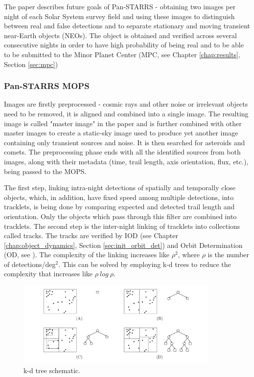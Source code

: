 	The paper describes future goals of Pan-STARRS - obtaining two images per night of each Solar System survey field and using these images to distinguish between real and false detections and to separate stationary and moving transient near-Earth objects (NEOs). The object is obtained and verified across several consecutive nights in order to have high probability of being real and to be able to be submitted to the Minor Planet Center (MPC, see Chapter \ref{chap:results}, Section \ref{sec:mpc})
	
\subsubsection{Pan-STARRS MOPS}
	
	Images are firstly preprocessed - cosmic rays and other noise or irrelevant objects need to be removed, it is aligned and combined into a single image. The resulting image is called "master image" in the paper and is further combined with other master images to create a static-sky image used to produce yet another image containing only transient sources and noise. It is then searched for asteroids and comets. The preprocessing phase ends with all the identified sources from both images, along with their metadata (time, trail length, axis orientation, flux, etc.), being passed to the MOPS.
	
	The first step, linking intra-night detections of spatially and temporally close objects, which, in addition, have fixed speed among multiple detections, into tracklets, is being done by comparing expected and detected trail length and orientation. Only the objects which pass through this filter are combined into tracklets. The second step is the inter-night linking of tracklets into collections called tracks. The tracks are verified by IOD (see Chapter \ref{chap:object_dynamics}, Section \ref{sec:init_orbit_det}) and Orbit Determination (OD, see \citep{klinkrad2006space}). The complexity of the linking increases like $\rho^2$, where $\rho$ is the number of detections/deg$^2$. This can be solved by employing k-d trees to reduce the complexity that increases like $\rho\ log\ \rho$.
	
	\begin{figure}[H]
	\centering
	  \includegraphics[width=10cm]{images/kd_tree}
		  \caption{k-d tree schematic.}
	  \label{fig:kd_tree}
	\end{figure}
	

